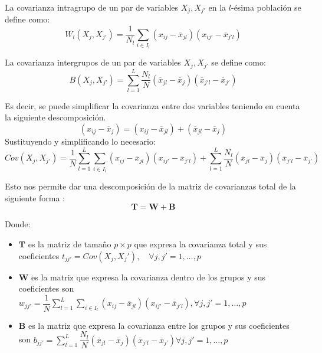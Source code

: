 \begin{defi}
\noindent La covarianza intragrupo de un par de variables $X_j,X_{j'}$ en la $l$-ésima población se define como:
\begin{equation}
W_l(X_j,X_{j'})=\dfrac{1}{N_l}\sum_{i\in I_l} (x_{ij}-\overline{x}_{jl})(x_{ij'}-\overline{x}_{j'l})
\end{equation}   
\end{defi}
\begin{defi}
\noindent La covarianza intergrupos de un par de variables $X_j,X_{j'}$  se define como:
\begin{equation}
B(X_j,X_{j'})=\sum_{l=1}^L\dfrac{N_l}{N}(\overline{x}_{jl}-\overline{x}_{j})(\overline{x}_{j'l}-\overline{x}_{j'})
\end{equation}   
\end{defi}
\noindent Es decir, se puede simplificar la covarianza entre dos variables teniendo en cuenta la siguiente descomposición. 
\begin{equation}
(x_{ij}-\overline{x}_j)=(x_{ij}-\overline{x}_{jl})+(\overline{x}_{jl}-\overline{x}_{j})
\end{equation}
\noindent Sustituyendo y simplificando lo necesario: 
\begin{equation}
Cov(X_j,X_{j'})=\dfrac{1}{N}\sum_{l=1}^L\sum_{i\in I_l}(x_{ij}-\overline{x}_{jl})(x_{ij'}-\overline{x}_{j'l})+\sum_{l=1}^L\dfrac{N_l}{N}(\overline{x}_{jl}-\overline{x}_{j})(\overline{x}_{j'l}-\overline{x}_{j'})
\end{equation}

\noindent Esto nos permite dar una descomposición de la matriz de covarianzas total de la siguiente forma :
\begin{equation}\label{descomposicion varianza}
\textbf{T}=\textbf{W}+\textbf{B}
\end{equation}

Donde:
\begin{itemize}
\item $\mathbf{T}$ es la matriz de tamaño $p\times p$ que expresa la covarianza total y sus coeficientes  $t_{jj'}=Cov(X_j,X_j'),\quad \forall j,j'=1,\ldots, p$
\item \textbf{W} es la matriz que expresa la covarianza dentro de los grupos y sus coeficientes son $w_{jj'}=\dfrac{1}{N}\sum_{l=1}^L\sum_{i\in I_l}(x_{ij}-\overline{x}_{jl})(x_{ij'}-\overline{x}_{j'l}),\forall j,j'=1,\ldots, p$
\item \textbf{B} es la matriz que expresa la covarianza entre los grupos y sus coeficientes son $b_{jj'}=\sum_{l=1}^L\dfrac{N_l}{N}(\overline{x}_{jl}-\overline{x}_{j})(\overline{x}_{j'l}-\overline{x}_{j'})\forall j,j'=1,\ldots, p$

\end{itemize}

